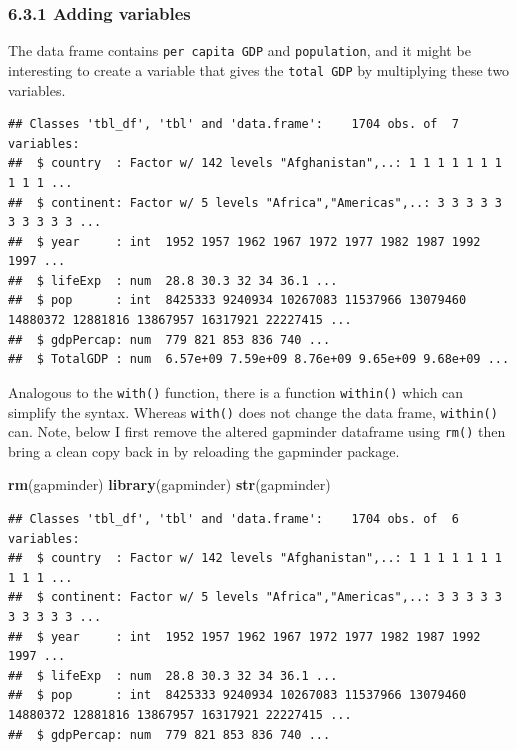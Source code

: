 \documentclass[]{article}
\newenvironment{Shaded}{\begin{snugshade}}{\end{snugshade}}
\newcommand{\KeywordTok}[1]{\textcolor[rgb]{0.13,0.29,0.53}{\textbf{#1}}}
\newcommand{\StringTok}[1]{\textcolor[rgb]{0.31,0.60,0.02}{#1}}
\newcommand{\OperatorTok}[1]{\textcolor[rgb]{0.81,0.36,0.00}{\textbf{#1}}}
\newcommand{\NormalTok}[1]{#1}
\begin{document}
\subsubsection{6.3.1 Adding variables}\label{adding-variables}

The data frame contains \texttt{per\ capita\ GDP} and
\texttt{population}, and it might be interesting to create a variable
that gives the \texttt{total\ GDP} by multiplying these two variables.

\begin{Shaded}
\end{Shaded}

\begin{verbatim}
## Classes 'tbl_df', 'tbl' and 'data.frame':    1704 obs. of  7 variables:
##  $ country  : Factor w/ 142 levels "Afghanistan",..: 1 1 1 1 1 1 1 1 1 1 ...
##  $ continent: Factor w/ 5 levels "Africa","Americas",..: 3 3 3 3 3 3 3 3 3 3 ...
##  $ year     : int  1952 1957 1962 1967 1972 1977 1982 1987 1992 1997 ...
##  $ lifeExp  : num  28.8 30.3 32 34 36.1 ...
##  $ pop      : int  8425333 9240934 10267083 11537966 13079460 14880372 12881816 13867957 16317921 22227415 ...
##  $ gdpPercap: num  779 821 853 836 740 ...
##  $ TotalGDP : num  6.57e+09 7.59e+09 8.76e+09 9.65e+09 9.68e+09 ...
\end{verbatim}

Analogous to the \texttt{with()} function, there is a function
\texttt{within()} which can simplify the syntax. Whereas \texttt{with()}
does not change the data frame, \texttt{within()} can. Note, below I
first remove the altered gapminder dataframe using \texttt{rm()} then
bring a clean copy back in by reloading the gapminder package.

\begin{Shaded}
\begin{Highlighting}[]
\KeywordTok{rm}\NormalTok{(gapminder)}
\KeywordTok{library}\NormalTok{(gapminder)}
\KeywordTok{str}\NormalTok{(gapminder)}
\end{Highlighting}
\end{Shaded}

\begin{verbatim}
## Classes 'tbl_df', 'tbl' and 'data.frame':    1704 obs. of  6 variables:
##  $ country  : Factor w/ 142 levels "Afghanistan",..: 1 1 1 1 1 1 1 1 1 1 ...
##  $ continent: Factor w/ 5 levels "Africa","Americas",..: 3 3 3 3 3 3 3 3 3 3 ...
##  $ year     : int  1952 1957 1962 1967 1972 1977 1982 1987 1992 1997 ...
##  $ lifeExp  : num  28.8 30.3 32 34 36.1 ...
##  $ pop      : int  8425333 9240934 10267083 11537966 13079460 14880372 12881816 13867957 16317921 22227415 ...
##  $ gdpPercap: num  779 821 853 836 740 ...
\end{verbatim}
\end{document}
